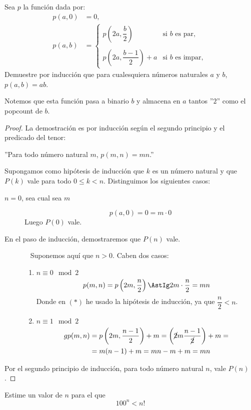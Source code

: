 \begin{ejemplo}
Sea $p$ la función dada por:
    \begin{align*}
        p(a,0) &= 0,\\
        p(a,b) &= \left\{ \begin{array}{ll}
            p\left(2a,\dfrac{b}{2}\right) & \text{si } b \text{ es par, }\\
                                        & \\
            p\left(2a,\dfrac{b-1}{2}\right)+a & \text{si } b \text{ es impar, }
    \end{array}\right.
    \end{align*}
    Demuestre por inducción que para cualesquiera números naturales $a$ y $b$, $p(a,b) = ab$.
    \begin{observacion}
        Notemos que esta función pasa a binario $b$ y almacena en $a$ tantos ''$2$'' como el popcount de $b$.
    \end{observacion}
    \begin{proof}
       La demostración es por inducción según el segundo principio y el predicado del tenor: 
        \begin{center}
            ''Para todo número natural $m$, $p(m,n) = mn$.''
        \end{center}
        Supongamos como hipótesis de inducción que $k$ es un número natural y que $P(k)$ vale para todo $0 \leq k < n$. Distinguimos los siguientes casos:
        \begin{description}
            \item [$n=0$, sea cual sea $m$]
                $$p(a,0) = 0 = m \cdot 0$$
                Luego $P(0)$ vale.
            \item [En el paso de inducción, demostraremos que $P(n)$ vale.]
                \ \newline
                Suponemos aquí que $n>0$. Caben dos casos:
                \begin{enumerate}
                    \item \ul{$n\equiv 0\mod 2$}
                        $$p(m,n) = p\left(2m, \dfrac{n}{2}\right) \AstIg 2m \cdot \dfrac{n}{2}=mn$$
                        Donde en $(\ast)$ he usado la hipótesis de inducción, ya que $\dfrac{n}{2} < n$.
                    \item \ul{$n\equiv 1\mod 2$}
                        \begin{align*}
                            gp(m,n) &= p\left(2m, \dfrac{n-1}{2}\right)+m =\left( \cancel{2}m \dfrac{n-1}{\cancel{2}}\right) +m =\\
                                    &= m(n-1)+m = mn-m+m = mn
                        \end{align*}
                \end{enumerate}
        \end{description}
        Por el segundo principio de inducción, para todo número natural $n$, vale $P(n)$.
    \end{proof}
\end{ejemplo}

\begin{ejercicio}
    Estime un valor de $n$ para el que
    $$100^n < n!$$
\end{ejercicio}
